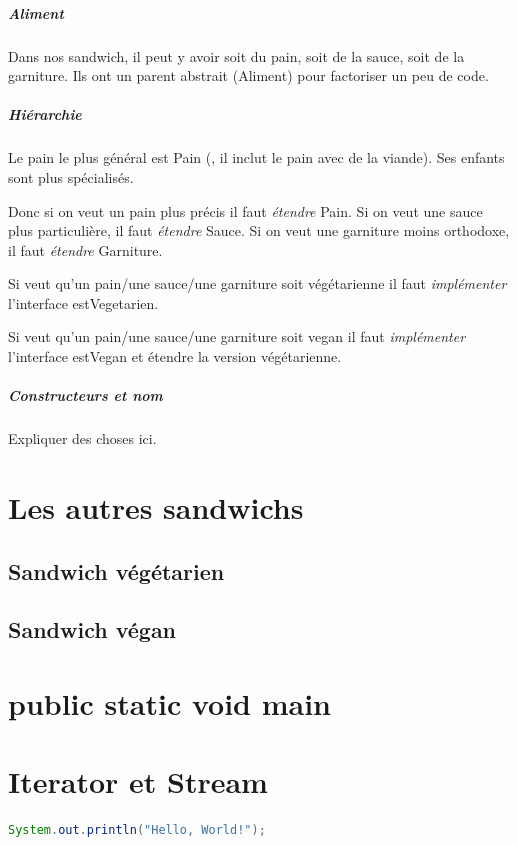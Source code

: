 \documentclass[a4paper]{article}
\begin{document}
\paragraph{}
\subparagraph{Aliment}
Dans nos sandwich, il peut y avoir soit du pain, soit de la sauce, soit de la garniture. Ils ont un parent abstrait (Aliment) pour factoriser un peu de code.

\subparagraph*{Hiérarchie}
Le pain le plus général est Pain (, il inclut le pain avec de la viande). Ses enfants sont plus spécialisés.

Donc si on veut un pain plus précis il faut \emph{étendre} Pain. Si on veut une sauce plus particulière, il faut \emph{étendre} Sauce. Si on veut une garniture moins orthodoxe, il faut \emph{étendre} Garniture.

Si veut qu'un pain/une sauce/une garniture soit végétarienne il faut \emph{implémenter} l'interface estVegetarien.

Si veut qu'un pain/une sauce/une garniture soit vegan il faut \emph{implémenter} l'interface estVegan et étendre la version végétarienne.

\subparagraph*{Constructeurs et nom}
Expliquer des choses ici.

\clearpage
\section{Les autres sandwichs}

\subsection{Sandwich végétarien}

\subsection{Sandwich végan}

\section{public static void main}

\section{Iterator et Stream}


\begin{lstlisting}[language=Java, caption=Java example]
    System.out.println("Hello, World!");
\end{lstlisting}
\end{document}
